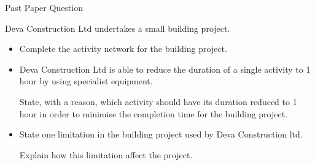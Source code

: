 \documentclass[8pt]{beamer}
\begin{document}
\begin{frame}{Past Paper Question}
	\begin{problem}
		Deva Construction Ltd undertakes a small building project. 

		\begin{center}
			
		\end{center}

		\begin{itemize}
			\item Complete the activity network for the building project.
			\item Deva Construction Ltd is able to reduce the duration of a single activity to 1 hour by using specialist equipment.

				State, with a reason, which activity should have its duration reduced to 1 hour in order to minimise the completion time for the building project.
			\item State one limitation in the building project used by Deva Construction ltd.

				Explain how this limitation affect the project.
		\end{itemize}

	\end{problem}

\end{frame}
\end{document}
